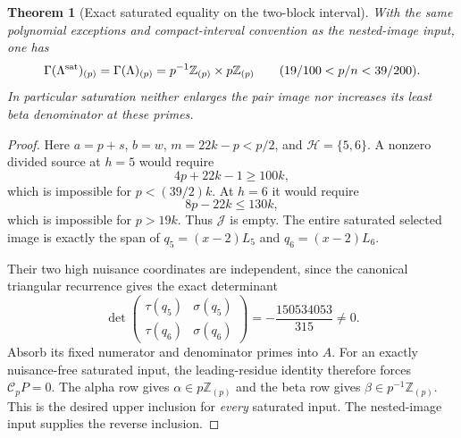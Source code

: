 \documentclass[11pt,a4paper]{article}
\numberwithin{equation}{section}
\newtheorem{theorem}{Theorem}[section]
\theoremstyle{definition}\newtheorem{definition}[theorem]{Definition}
\theoremstyle{remark}\newtheorem{remark}[theorem]{Remark}
\begin{document}
\begin{theorem}[Exact saturated equality on the two-block interval]
\label{sat:reiwa:gapclosed}
With the same polynomial exceptions and compact-interval convention
as the nested-image input, one has
\[
 \Gamma(\Lambda^{\rm sat})_{(p)}
 =\Gamma(\Lambda)_{(p)}
 =p^{-1}\mathbb Z_{(p)}\times p\mathbb Z_{(p)}
 \qquad(19/100<p/n<39/200).
\]
In particular saturation neither enlarges the pair image nor
increases its least beta denominator at these primes.
\end{theorem}
\begin{proof}
Here $a=p+s$, $b=w$, $m=22k-p<p/2$, and
$\mathcal H=\{5,6\}$. A nonzero divided source at $h=5$ would
require
\[
 4p+22k-1\ge100k,
\]
which is impossible for $p<(39/2)k$. At $h=6$ it would require
\[
 8p-22k\le130k,
\]
which is impossible for $p>19k$. Thus $\mathcal J$ is empty.
The entire saturated selected image is exactly the span of
$q_5=(x-2)L_5$ and $q_6=(x-2)L_6$.

Their two high nuisance coordinates are independent, since the
canonical triangular recurrence gives the exact determinant
\[
 \det\begin{pmatrix}\tau(q_5)&\sigma(q_5)\\
                     \tau(q_6)&\sigma(q_6)\end{pmatrix}
             =-\frac{150534053}{315}\ne0.
\]
Absorb its fixed numerator and denominator primes into $A$.
For an exactly nuisance-free saturated input, the leading-residue
identity therefore forces $\mathcal C_pP=0$. The alpha row gives
$\alpha\in p\mathbb Z_{(p)}$ and the beta row gives
$\beta\in p^{-1}\mathbb Z_{(p)}$. This is the desired upper
inclusion for \emph{every} saturated input. The nested-image
input supplies the reverse inclusion.
\end{proof}
\end{document}
